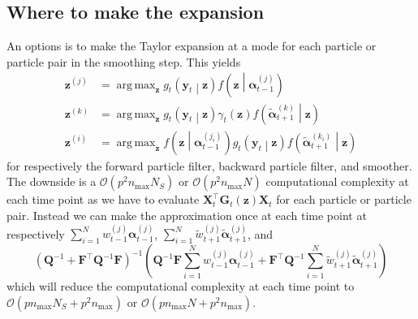 \documentclass[notitlepage]{article}
\DeclareMathOperator*{\argmax}{arg\,max}
\renewcommand{\vec}[1]{\bm{#1}}
\newcommand{\mat}[1]{\mathbf{#1}}
\newcommand{\Lparen}[1]{\left( #1\right)}
\newcommand{\Cond}[2]{ #1 \middle\vert  #2}
\newcommand{\optor}[2]{#1\Lparen{#2}}
\newcommand{\optorC}[3]{\optor{#1}{\Cond{#2}{#3}}}
\newcommand{\gFunc}[3]{\optorC{g_{#3}}{#1}{#2}}
\newcommand{\fFunc}[2]{\optorC{f}{#1}{#2}}
\newcommand{\partic}[3]{#1_{#2}^{\Lparen{#3}}}
\newcommand{\particB}[3]{\widetilde{#1}_{#2}^{\Lparen{#3}}}
\newcommand{\bigO}[1]{\mathcal{O}\Lparen{#1}}
\newcommand{\dimState}{p}
\newcommand{\nPart}{N}
\newcommand{\nMax}{n_{\text{max}}}
\begin{document}
\subsection{Where to make the expansion}
An options is to make the Taylor expansion at a mode for each particle or particle pair in the smoothing step. This yields%
%
\begin{align*}
\vec z^{(j)} &= \argmax_{\vec z }
	\optorC{g_t}{\vec{y}_t}{\vec z}
	\optorC{f}{\vec z}{\partic{\vec\alpha}{t-1}j} \\
\vec z^{(k)} &= \argmax_{\vec z }
	\optorC{g_t}{\vec{y}_t}{\vec z}
	\gamma_t(\vec{z})
	\optorC{f}{\particB{\vec{\alpha}}{t + 1}k}{\vec z}\\
\vec z^{(i)} &= \argmax_{\vec z }
	\fFunc{\vec z}{\partic{\vec{\alpha}}{t - 1}{j_i}}
 	\gFunc{\vec{y}_t}{\vec z}{t}
 	\fFunc{\particB{\vec{\alpha}}{t + 1}{k_i}}{\vec z}
\end{align*}%
% 
for respectively the forward particle filter, backward particle filter, and smoother.
The downside is a $\bigO{\dimState^2\nMax\nPart_S}$ or $\bigO{\dimState^2\nMax\nPart}$ 
computational complexity at each time point 
as we have to evaluate $\mat X_t^\top \mat G_t(\vec z) \mat X_t$
for each particle or particle pair. Instead we can make the approximation 
once at each time point at 
respectively $\sum_{i=1}^\nPart \partic w{t-1}j\partic{\vec\alpha}{t-1}j$, %
$\sum_{i=1}^\nPart \particB w{t+1}j\particB{\vec\alpha}{t+1}j$, and %
%
$$
\Lparen{\mat Q^{-1} + \mat F^\top \mat Q^{-1}\mat F}^{-1}
\Lparen{\mat Q^{-1}\mat F\sum_{i=1}^\nPart \partic w{t-1}j\partic{\vec\alpha}{t-1}j + 
	\mat F^\top\mat Q^{-1}\sum_{i=1}^\nPart \particB w{t+1}j\particB{\vec\alpha}{t+1}j}
$$%
% 
which will reduce the computational complexity  at each time point to %
$\bigO{\dimState\nMax\nPart_S + \dimState^2\nMax}$ %
or $\bigO{\dimState\nMax\nPart  + \dimState^2\nMax}$. 
\end{document}
